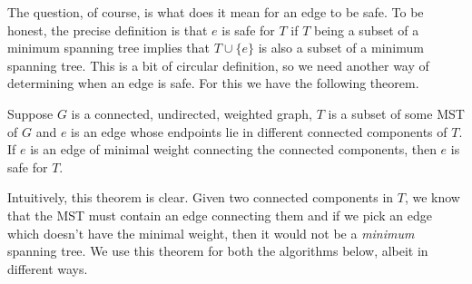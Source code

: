 The question, of course, is what does it mean for an edge to be safe. To be honest, the precise definition is that $e$ is safe for $T$ if $T$ being a subset of a minimum spanning tree implies that $T \cup \{e\}$ is also a subset of a minimum spanning tree. This is a bit of circular definition, so we need another way of determining when an edge is safe. For this we have the following theorem.
\begin{theorem}
Suppose $G$ is a connected, undirected, weighted graph, $T$ is a subset of some MST of $G$ and $e$ is an edge whose endpoints lie in different connected components of $T$. If $e$ is an edge of minimal weight connecting the connected components, then $e$ is safe for $T$.
\end{theorem}
Intuitively, this theorem is clear. Given two connected components in $T$, we know that the MST must contain an edge connecting them and if we pick an edge which doesn't have the minimal weight, then it would not be a \textit{minimum} spanning tree. We use this theorem for both the algorithms below, albeit in different ways.

